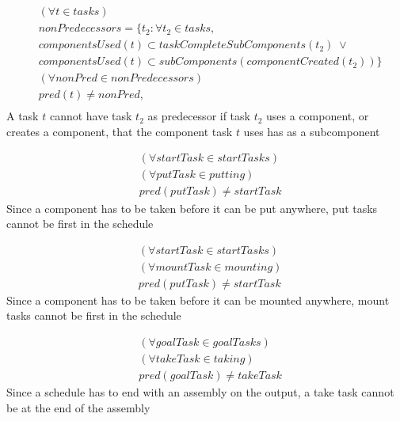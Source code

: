  \begin{equation}
 \begin{aligned}\label{eq:78}
 &(\forall t \in tasks)\\
 &nonPredecessors = \{t_2 : \forall t_2 \in tasks, \\
 &componentsUsed(t) \subset taskCompleteSubComponents(t_2) \; \lor \\
 &componentsUsed(t) \subset subComponents(componentCreated(t_2))\} \\
 &(\forall nonPred \in nonPredecessors) \\
 &pred(t) \neq nonPred, \\
 \end{aligned}
 \end{equation}
 A task $t$ cannot have task $t_2$ as predecessor if task $t_2$ uses a component, or creates a component, that the component task $t$ uses has as a subcomponent
 
 \begin{equation}\label{eq:79}
 \begin{aligned}
 &(\forall startTask \in startTasks)\\
 &(\forall putTask \in putting)\\
 &pred(putTask) \neq startTask
 \end{aligned}
 \end{equation}
 Since a component has to be taken before it can be put anywhere, put tasks cannot be first in the schedule
 
 \begin{equation}\label{eq:80}
 \begin{aligned}
 &(\forall startTask \in startTasks)\\
 &(\forall mountTask \in mounting)\\
 &pred(putTask) \neq startTask 
 \end{aligned}
 \end{equation}
 Since a component has to be taken before it can be mounted anywhere, mount tasks cannot be first in the schedule
 
 \begin{equation}\label{eq:81}
 \begin{aligned}
 &(\forall goalTask \in goalTasks) \\
 &(\forall takeTask \in taking) \\
 &pred(goalTask) \neq takeTask
 \end{aligned}
 \end{equation}
 Since a schedule has to end with an assembly on the output, a take task cannot be at the end of the assembly
 
